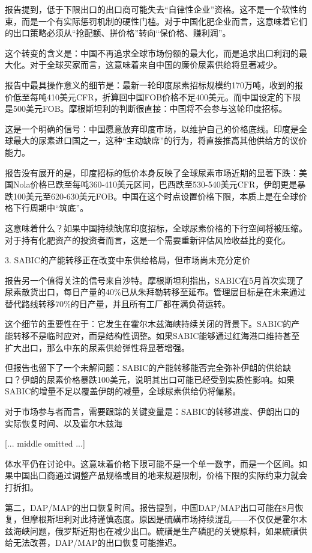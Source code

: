 \documentclass[11pt]{ctexart}
\begin{document}
报告提到，低于下限出口的出口商可能失去“自律性企业”资格。这不是一个软性约束，而是一个有实际惩罚机制的硬性门槛。对于中国化肥企业而言，这意味着它们的出口策略必须从“抢配额、拼价格”转向“保价格、赚利润”。

这个转变的含义是：中国不再追求全球市场份额的最大化，而是追求出口利润的最大化。对于全球买家而言，这意味着来自中国的廉价尿素供给将显著减少。

报告中最具操作意义的细节是：最新一轮印度尿素招标规模约170万吨，收到的报价低至每吨410美元CFR，折算回中国FOB价格不足400美元。而中国设定的下限是500美元FOB。摩根斯坦利的判断很直接：中国将不会参与这轮印度招标。

这是一个明确的信号：中国愿意放弃印度市场，以维护自己的价格底线。印度是全球最大的尿素进口国之一，这种“主动缺席”的行为，将直接推高其他供给方的议价能力。

报告没有展开的是，印度招标的低价本身反映了全球尿素市场近期的显著下跌：美国Nola价格已跌至每吨360-410美元区间，巴西跌至530-540美元CFR，伊朗更是暴跌100美元至620-630美元FOB。中国在这个时点设置价格下限，本质上是在全球价格下行周期中“筑底”。

这意味着什么？如果中国持续缺席印度招标，全球尿素价格的下行空间将被压缩。对于持有化肥资产的投资者而言，这是一个需要重新评估风险收益比的变化。

3. SABIC的产能转移正在改变中东供给格局，但市场尚未充分定价

报告另一个值得关注的信号来自沙特。摩根斯坦利指出，SABIC在5月首次实现了尿素散货出口，每日产量的40\%已从朱拜勒转移至延布。管理层目标是在未来通过替代路线转移70\%的日产量，并且所有工厂都在满负荷运转。

这个细节的重要性在于：它发生在霍尔木兹海峡持续关闭的背景下。SABIC的产能转移不是临时应对，而是结构性调整。如果SABIC能够通过红海港口维持甚至扩大出口，那么中东的尿素供给弹性将显著增强。

但报告也留下了一个未解问题：SABIC的产能转移能否完全弥补伊朗的供给缺口？伊朗的尿素价格暴跌100美元，说明其出口可能已经受到实质性影响。如果SABIC的增量不足以覆盖伊朗的减量，全球尿素供给仍将偏紧。

对于市场参与者而言，需要跟踪的关键变量是：SABIC的转移进度、伊朗出口的实际恢复时间、以及霍尔木兹海

[... middle omitted ...]

体水平仍在讨论中。这意味着价格下限可能不是一个单一数字，而是一个区间。如果中国出口商通过调整产品规格或目的地来规避限制，价格下限的实际约束力就会打折扣。

第二，DAP/MAP的出口恢复时间。报告提到，中国DAP/MAP出口可能在8月恢复，但摩根斯坦利对此持谨慎态度。原因是硫磺市场持续混乱——不仅仅是霍尔木兹海峡问题，俄罗斯近期也在减少出口。硫磺是生产磷肥的关键原料，如果硫磺供给无法改善，DAP/MAP的出口恢复可能推迟。
\end{document}
